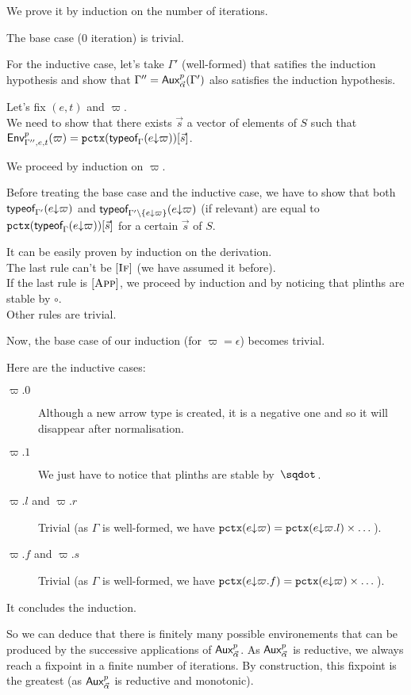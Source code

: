 \documentclass[a4paper]{article}
\theoremstyle{definition}
\begin{document}
    We prove it by induction on the number of iterations.

    The base case (0 iteration) is trivial.

    For the inductive case, let's take $\Gamma'$ (well-formed) that satifies the induction hypothesis
    and show that $\Gamma'' = \textsf{Aux}^{p}_{\vec \alpha}(\Gamma')$ also satisfies the induction hypothesis.

    Let's fix $(e,t)$ and $\varpi$.\\
    We need to show that there exists $\vec s$ a vector of elements of $S$ such that $\textsf{Env}^{p}_{\Gamma'',e,t} (\varpi) = \texttt{pctx}(\textsf{typeof}_{\Gamma}(e{\downarrow}\varpi))[\vec s]$.
    
    We proceed by induction on $\varpi$.

    Before treating the base case and the inductive case, we have to show that both $\textsf{typeof}_{\Gamma'}(e{\downarrow}\varpi)$
    and $\textsf{typeof}_{\Gamma'\setminus\{e{\downarrow}\varpi\}}(e{\downarrow}\varpi)$ (if relevant) are equal to $\texttt{pctx}(\textsf{typeof}_{\Gamma}(e{\downarrow}\varpi))[\vec s]$ for a certain $\vec s$ of $S$.

    It can be easily proven by induction on the derivation.\\
    The last rule can't be $[\textsc{If}]$ (we have assumed it before).\\
    If the last rule is $[\textsc{App}]$, we proceed by induction and by noticing that plinths are stable by $\circ$.\\
    Other rules are trivial.

    Now, the base case of our induction (for $\varpi=\epsilon$) becomes trivial.

    Here are the inductive cases:
    \begin{description}
      \item[$\varpi.0$] Although a new arrow type is created, it is a negative one and so it will disappear after normalisation.
      \item[$\varpi.1$] We just have to notice that plinths are stable by $\worra {} {}$.
      \item[$\varpi.l$ and $\varpi.r$] Trivial (as $\Gamma$ is well-formed, we have $\texttt{pctx}(e{\downarrow}\varpi) = \texttt{pctx}(e{\downarrow}\varpi.l)\times \dots$).
      \item[$\varpi.f$ and $\varpi.s$] Trivial (as $\Gamma$ is well-formed, we have $\texttt{pctx}(e{\downarrow}\varpi.f) = \texttt{pctx}(e{\downarrow}\varpi)\times \dots$).
    \end{description}

    It concludes the induction.

    So we can deduce that there is finitely many possible environements that can be produced by the successive applications of $\textsf{Aux}^{p}_{\vec \alpha}$.
    As $\textsf{Aux}^{p}_{\vec \alpha}$ is reductive, we always reach a fixpoint in a finite number of iterations.
    By construction, this fixpoint is the greatest (as $\textsf{Aux}^{p}_{\vec \alpha}$ is reductive and monotonic).
\end{document}
